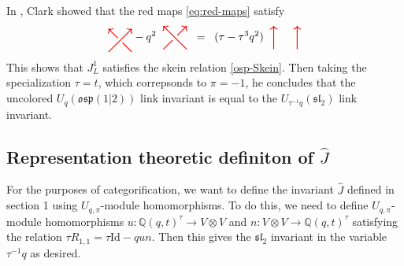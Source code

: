 \documentclass{amsart}
\newcommand{\hackcenter}[1]{
 \xy (0,0)*{#1}; \endxy}
\def\Q{\mathsf{Q}}
\theoremstyle{plain}
\theoremstyle{definition}
\newtheorem{definition}[theorem]{Definition}
\theoremstyle{definition}
\numberwithin{equation}{section}
\numberwithin{theorem}{section}
\renewcommand{\to}{\rightarrow}
\def\Id{\mathrm{Id}}
\def\mf{\mathfrak}
\def\Q{\mathbb{Q}}
\numberwithin{equation}{section}
\def\ME#1{\textcolor[rgb]{0.40,0.00,0.90}{[ME: #1]}}%
\let\hat=\widehat
\begin{document}
In \cite[Example 3.10]{C}, Clark showed that the red maps \ref{eq:red-maps} satisfy
\begin{align*}
\hackcenter{ \begin{tikzpicture} [scale=.75]
\draw[thick, red, ->] (0,0) to (1,1);
\draw[thick, red, -] (1,0) to (.6,.4);
\draw[thick, red, <-] (0,1) to (.4,.6);
\end{tikzpicture}}
- q^2\;\;
\hackcenter{ \begin{tikzpicture} [xscale=-1,scale=.75]
\draw[thick, red, ->] (0,0) to (1,1);
\draw[thick, red, -] (1,0) to (.6,.4);
\draw[thick, red, <-] (0,1) to (.4,.6);
\end{tikzpicture}}
\;\;=\;\;
(\tau-\tau^3 q^2)\;\;
\hackcenter{ \begin{tikzpicture} [scale=.75]
\draw[thick,   red,->] (0,0) to (0,1);
\draw[thick,   red,->] (1,0) to (1,1);
\end{tikzpicture}}
\end{align*}
This shows that $J_L^1$ satisfies the skein relation \ref{osp-Skein}.
Then taking the specialization $\tau=t$, which correpsonds to $\pi=-1$, he concludes that the uncolored $U_q(\mf{osp}(1|2))$ link invariant is equal to the $U_{\tau^{-1}q}(\mf{sl}_2)$ link invariant.


\subsection{Representation theoretic definiton of $\hat{J}$}\label{Sec:Our-method}

For the purposes of categorification, we want to define the invariant $\hat{J}$ defined in section 1 using $U_{q,\pi}$-module homomorphisms.
To do this, we need to define $U_{q,\pi}$-module homomorphisms $u: \Q(q,t)^\tau \to V \otimes V$ and $n: V \otimes V \to \Q(q,t)^\tau$ satisfying the relation $\tau R_{1,1}=\tau \Id -q un$.
Then this gives the $\mf{sl}_2$ invariant in the variable $\tau^{-1}q$ as desired.

\end{document}
